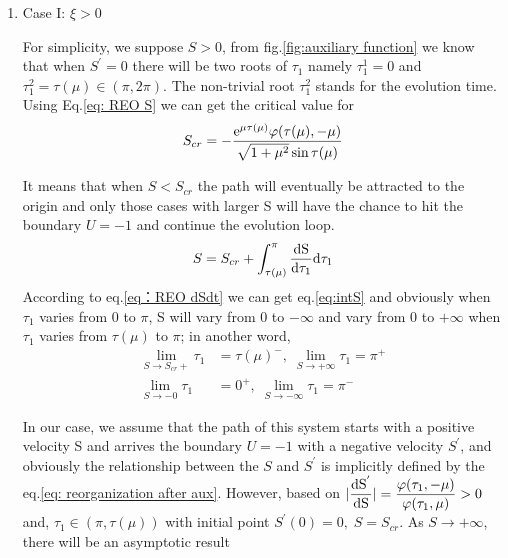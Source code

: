 \documentclass[a4paper,10pt]{article}
\begin{document}
	\begin{enumerate}
		\item {Case I: $\xi>0$}
		
		For simplicity, we suppose $S>0$, from fig.\ref{fig:auxiliary function}  we know that when $S^{'}=0$ there will be two roots of $\tau_1$ namely $\tau_1^1=0$ and $\tau_1^2=\tau(\mu)\in (\pi,2\pi)$. The non-trivial root $\tau_1^2$ stands for the evolution time. Using Eq.\ref{eq: REO S} we can get the critical value for \[S_{cr}=-\frac{{\rm e}^{\mu \tau(\mu)}\varphi(\tau(\mu),-\mu)}{\sqrt{1+\mu^2}\sin{\tau(\mu)}}\]
		
		It means that when $S<S_{cr}$ the path will eventually be attracted to the origin and only those cases with larger S will have the chance to hit the boundary $U=-1$ and continue the evolution loop.
		\begin{equation} 
		S=S_{cr}+\int_{\tau(\mu)}^{\pi}\frac{\rm d S}{\rm d \tau_1} \rm d \tau_1
		\label{eq:intS}
		\end{equation}
		According to eq.\ref{eq：REO dSdt} we can get eq.\ref{eq:intS} and obviously when $\tau_1$ varies from 0 to $\pi$, S will vary from 0 to $-\infty$ and vary from 0 to $+\infty$ when $\tau_1$ varies from $\tau(\mu)$ to $\pi$; in another word,
		\begin{align}
		\lim_{S \rightarrow S_{cr}+}\tau_1&=\tau(\mu)^-, \; \lim_{S \rightarrow +\infty}\tau_1=\pi^+ 
		\label{eq:admissible eq evolution}
		\\
		\lim_{S \rightarrow -0}\tau_1&=0^+,\;\lim_{S \rightarrow -\infty}\tau_1=\pi^-
		\label{eq:pseudo eq evolution}
		\end{align}
		
		In our case, we assume that the path of this system starts with a positive velocity S and arrives the boundary $U=-1$ with a negative velocity $S^{'}$, and obviously the relationship between the $S$ and $S^{'}$ is implicitly defined by the eq.\ref{eq: reorganization after aux}. However, based on $\displaystyle |\frac{\rm d S^{'}}{\rm d S}|=\frac{\varphi(\tau_1,-\mu)}{\varphi(\tau_1,\mu)}>0$ and, $\tau_1 \in (\pi,\tau(\mu))$ with initial point $S^{'}(0)=0,\;S=S_{cr}$. As $S\rightarrow+\infty$, there will be an asymptotic result
		

\end{enumerate}
\end{document}
